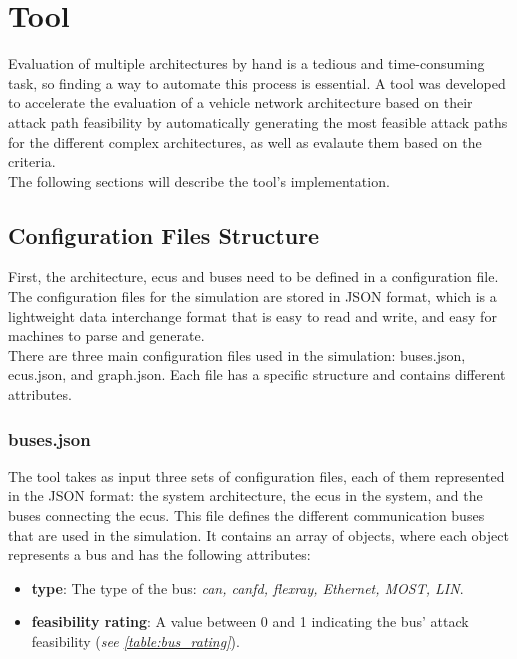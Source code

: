\chapter{Tool}
\label{chp:tool}

Evaluation of multiple architectures by hand is a tedious and time-consuming task, so finding a way to automate this process is essential.
A tool was developed to accelerate the evaluation of a vehicle network architecture based on their attack path feasibility
by automatically generating the most feasible attack paths for the different complex architectures, as well as evalaute them based on the criteria.
\\

The following sections will describe the tool's implementation.

\section{Configuration Files Structure}
\label{sec:config}

First, the architecture, \acrshort{ecu}s and buses need to be defined in a configuration file.
The configuration files for the simulation are stored in JSON format, 
which is a lightweight data interchange format that is easy to read and write, and easy for machines to parse and generate.\\

There are three main configuration files used in the simulation: buses.json, ecus.json, and graph.json.
Each file has a specific structure and contains different attributes.

\subsection{buses.json}
\label{sec:buses}

The tool takes as input three sets of configuration files, each of them represented in the JSON format: 
the system architecture, the \acrshort{ecu}s in the system, and the buses connecting the \acrshort{ecu}s. 
This file defines the different communication buses that are used in the simulation. 
It contains an array of objects, where each object represents a bus and has the following attributes:

\begin{itemize}
\item \textbf{type}: The type of the bus: \textit{\acrshort{can}, \acrshort{canfd}, \acrshort{flexray}, Ethernet, MOST, LIN}.
\item \textbf{feasibility rating}: A value between 0 and 1 indicating the bus' attack feasibility (\textit{see \ref{table:bus_rating}}).
\end{itemize}

